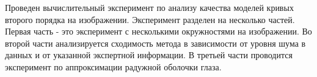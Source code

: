 Проведен вычислительный эксперимент по анализу качества моделей кривых второго порядка на изображении. Эксперимент разделен на несколько частей. Первая часть - это эксперимент с несколькими окружностями на изображении. Во второй части анализируется сходимость метода в зависимости от уровня шума в данных и от указанной экспертной информации. В третьей части проводится эксперимент по аппроксимации радужной оболочки глаза.

\begin{figure}[!ht]
\center

\end{figure}
